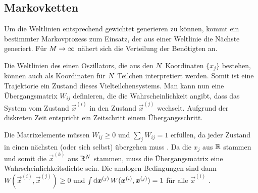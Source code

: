 \subsection{Markovketten}

Um die Weltlinien entsprechend gewichtet generieren zu können, kommt ein
bestimmter Markovprozess zum Einsatz, der aus einer Weltlinie die Nächste
generiert. Für $M \to \infty$ nähert sich die Verteilung der
Benötigten an. \parencite[434]{Creutz/Statistical_Approach_QM}


Die Weltlinien des einen Oszillators, die aus den $N$ Koordinaten
$\{x_j\}$ bestehen, können auch als Koordinaten für $N$ Teilchen
interpretiert werden. Somit ist eine Trajektorie ein Zustand dieses
Vielteilchensystems. Man kann nun eine Übergangsmatrix $W_{ij}$ definieren, die
die Wahrscheinlichkeit angibt, dass das System vom Zustand $\vec x^{(i)}$ in
den Zustand $\vec x^{(j)}$ wechselt. Aufgrund der diskreten Zeit entspricht ein
Zeitschritt einem Übergangsschritt.

Die Matrixelemente müssen $W_{ij} \geq 0$ und $\sum_j W_{ij} = 1$ erfüllen, da
jeder Zustand in einen nächsten (oder sich selbst) übergehen muss
\parencite[(3.8)]{Creutz/Statistical_Approach_QM}. Da die $x_j$ aus $\mathbb R$
stammen und somit die $\vec x^{(k)}$ aus $\mathbb R^N$ stammen, muss die
Übergangsmatrix eine Wahrscheinlichkeitsdichte sein. Die analogen Bedingungen
sind dann $W(\vec x^{(i)}, \vec x^{(j)}) \geq 0$ und $\int \dif \vec x^{(j)} \,
W(\vec x^{(i)}, \vec x^{(j)}) = 1$ für alle $\vec x^{(i)}$
\parencite[(3.9)]{Creutz/Statistical_Approach_QM}.


